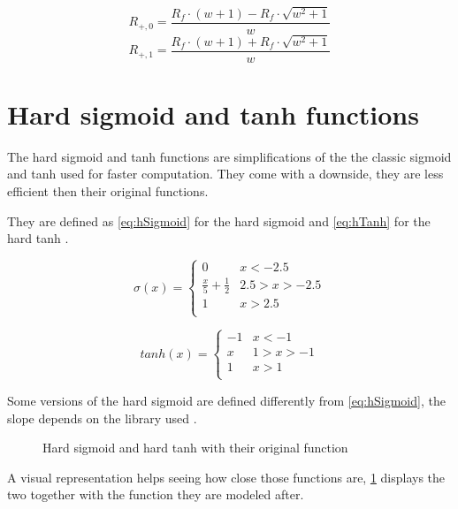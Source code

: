 \begin{equation}\label{eq:wei2res62}
  R_{+,0}=\frac{R_f\cdot(w+1)-R_f\cdot\sqrt{w^2+1}}{w}
\end{equation}
\begin{equation}\label{eq:wei2res63}
  R_{+,1}=\frac{R_f\cdot(w+1)+R_f\cdot\sqrt{w^2+1}}{w}
\end{equation}

\section{Hard sigmoid and \ac{tanh} functions}\label{apsec:hardFunc}

The hard sigmoid and \ac{tanh} functions are simplifications of the the classic sigmoid and \ac{tanh} used for faster computation. They come with a downside, they are less efficient then their original functions.

They are defined as \cref{eq:hSigmoid} for the hard sigmoid and \cref{eq:hTanh} for the hard \ac{tanh} \cite{hSigmoid, hTanh}.


\begin{equation}\label{eq:hSigmoid}
  \sigma (x) =
  \begin{cases}
    0& x< -2.5\\
    \frac{x}{5}+\frac{1}{2}&  2.5>x>-2.5\\
    1& x> 2.5\\
  \end{cases}
\end{equation}

\begin{equation}\label{eq:hTanh}
  tanh(x) =
  \begin{cases}
    -1& x<-1\\
    x& 1>x>-1\\
    1& x>1\\
  \end{cases}
\end{equation}

Some versions of the hard sigmoid are defined differently from \cref{eq:hSigmoid}, the slope depends on the library used \cite{hSigmoid1}.

\begin{figure}[H]
  \centering
  
  \caption{Hard sigmoid and hard \acs{tanh} with their original function}
  \label{graph:hardFunc}
\end{figure}

A visual representation helps seeing how close those functions are, \cref{graph:hardFunc} displays the two together with the function they are modeled after.

\cleardoublepage
